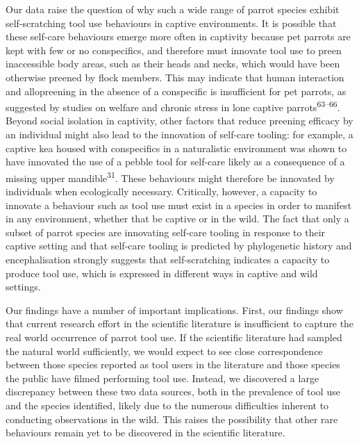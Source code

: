 \documentclass[
  man, donotrepeattitle,floatsintext]{apa6}
\begin{document}
Our data raise the question of why such a wide range of parrot species exhibit
self-scratching tool use behaviours in captive environments. It is possible that
these self-care behaviours emerge more often in captivity because pet parrots
are kept with few or no conspecifics, and therefore must innovate tool use to
preen inaccessible body areas, such as their heads and necks, which would have
been otherwise preened by flock members. This may indicate that human
interaction and allopreening in the absence of a conspecific is insufficient for
pet parrots, as suggested by studies on welfare and chronic stress in lone
captive parrots\textsuperscript{63--66}. Beyond
social isolation in captivity, other factors that reduce preening efficacy by an
individual might also lead to the innovation of self-care tooling: for example,
a captive kea housed with conspecifics in a naturalistic environment was shown
to have innovated the use of a pebble tool for self-care likely as a consequence
of a missing upper mandible\textsuperscript{31}. These behaviours might therefore be
innovated by individuals when ecologically necessary. Critically, however, a
capacity to innovate a behaviour such as tool use must exist in a species in
order to manifest in any environment, whether that be captive or in the wild.
The fact that only a subset of parrot species are innovating self-care tooling
in response to their captive setting and that self-care tooling is predicted by
phylogenetic history and encephalisation strongly suggests that self-scratching
indicates a capacity to produce tool use, which is expressed in different ways
in captive and wild settings.

Our findings have a number of important implications. First, our findings show
that current research effort in the scientific literature is insufficient to
capture the real world occurrence of parrot tool use. If the scientific
literature had sampled the natural world sufficiently, we would expect to see
close correspondence between those species reported as tool users in the
literature and those species the public have filmed performing tool use.
Instead, we discovered a large discrepancy between these two data sources, both
in the prevalence of tool use and the species identified, likely due to the
numerous difficulties inherent to conducting observations in the wild. This
raises the possibility that other rare behaviours remain yet to be discovered in
the scientific literature.
\end{document}
